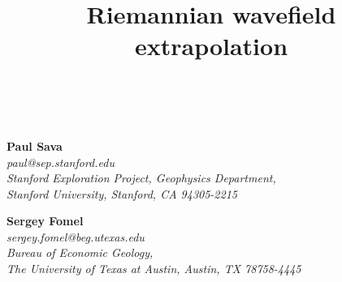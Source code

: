 \title{Riemannian wavefield extrapolation}
\author{\ }
\maketitle

\begin{center}
\textbf{Paul Sava} \\
{\it{
paul@sep.stanford.edu \\
Stanford Exploration Project, Geophysics Department, \\
Stanford University, Stanford, CA 94305-2215}}

\textbf{Sergey Fomel} \\
{\it{
sergey.fomel@beg.utexas.edu \\
Bureau of Economic Geology, \\
The University of Texas at Austin, Austin, TX 78758-4445}}

\end{center}











%





